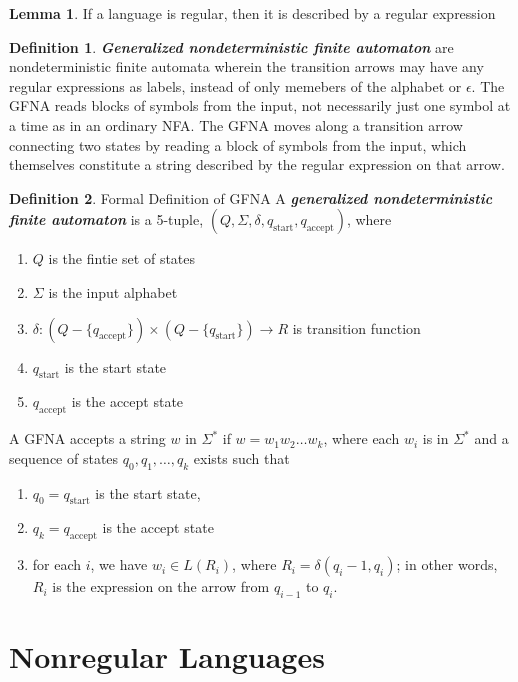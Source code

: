 \documentclass{article}
\theoremstyle{definition}
\newtheorem{definition}{Definition}[section]
\newtheorem{lemma}{Lemma}
\newcommand{\define}[1]{\textbf{\textit{#1}}}
\begin{document}
\begin{lemma}
  If a language is regular, then it is described by a regular expression
\end{lemma}

\begin{definition}{\define{Generalized nondeterministic finite automaton}}
  are nondeterministic finite automata wherein the transition arrows may have any regular expressions as labels, instead of only memebers of the alphabet or $\epsilon$. The GFNA reads blocks of symbols from the input, not necessarily just one symbol at a time as in an ordinary NFA. The GFNA moves along a transition arrow connecting two states by reading a block of symbols from the input, which themselves constitute a string described by the regular expression on that arrow.  
\end{definition}

\begin{definition}{Formal Definition of GFNA}
  A \define{generalized nondeterministic finite automaton} is a 5-tuple, $(Q,\Sigma,\delta,q_{\textrm{start}},q_{\textrm{accept}})$, where 
  \begin{enumerate}
    \item $Q$ is the fintie set of states 
    \item $\Sigma$ is the input alphabet 
    \item $\delta : (Q - \{q_{\textrm{accept}}\}) \times (Q - \{q_{\textrm{start}}\}) \rightarrow R$ is transition function
    \item $q_{\textrm{start}}$ is the start state 
    \item $q_{\textrm{accept}}$ is the accept state
  \end{enumerate}
\end{definition}

A GFNA accepts a string $w$ in $\Sigma^{*}$ if $w=w_1 w_2 \dots w_k$, where each $w_i$ is in $\Sigma^{*}$ and a sequence of states $q_0 , q_1 , \dots , q_k$ exists such that 
\begin{enumerate}
  \item $q_0 = q_{\textrm{start}}$ is the start state, 
  \item $q_k = q_{\textrm{accept}}$ is the accept state 
  \item for each $i$, we have $w_i \in L(R_i)$, where $R_i = \delta(q_i - 1, q_i)$; in other words, $R_i$ is the expression on the arrow from $q_{i-1}$ to $q_i$. 
\end{enumerate}

\section{Nonregular Languages}

\end{document}
